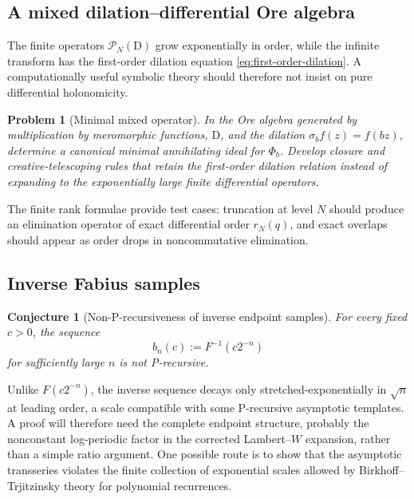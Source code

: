 \documentclass[11pt]{article}
\numberwithin{equation}{section}
\newtheorem{conjecture}[theorem]{Conjecture}
\newtheorem{problem}[theorem]{Problem}
\theoremstyle{definition}
\theoremstyle{remark}
\newcommand{\D}{\mathrm D}
\begin{document}
\subsection{A mixed dilation--differential Ore algebra}

The finite operators $\mathcal P_N(\D)$ grow exponentially in order, while the
infinite transform has the first-order dilation equation
\eqref{eq:first-order-dilation}.  A computationally useful symbolic theory
should therefore not insist on pure differential holonomicity.

\begin{problem}[Minimal mixed operator]
\label{problem:mixed-Ore}
In the Ore algebra generated by multiplication by meromorphic functions,
$\D$, and the dilation $\sigma_bf(z)=f(bz)$, determine a canonical minimal
annihilating ideal for $\Phi_b$.  Develop closure and creative-telescoping rules
that retain the first-order dilation relation instead of expanding to the
exponentially large finite differential operators.
\end{problem}

The finite rank formulae provide test cases: truncation at level $N$ should
produce an elimination operator of exact differential order $r_N(q)$, and
exact overlaps should appear as order drops in noncommutative elimination.

\subsection{Inverse Fabius samples}

\begin{conjecture}[Non-P-recursiveness of inverse endpoint samples]
\label{conj:inverse-samples}
For every fixed $c>0$, the sequence
\begin{equation}
 b_n(c):=F^{-1}(c2^{-n})
 \label{eq:inverse-sample}
\end{equation}
for sufficiently large $n$ is not P-recursive.
\end{conjecture}

Unlike $F(c2^{-n})$, the inverse sequence decays only stretched-exponentially
in $\sqrt n$ at leading order, a scale compatible with some P-recursive
asymptotic templates.  A proof will therefore need the complete endpoint
structure, probably the nonconstant log-periodic factor in the corrected
Lambert--$W$ expansion, rather than a simple ratio argument.  One possible
route is to show that the asymptotic transseries violates the finite collection
of exponential scales allowed by Birkhoff--Trjitzinsky theory for polynomial
recurrences.
\end{document}

